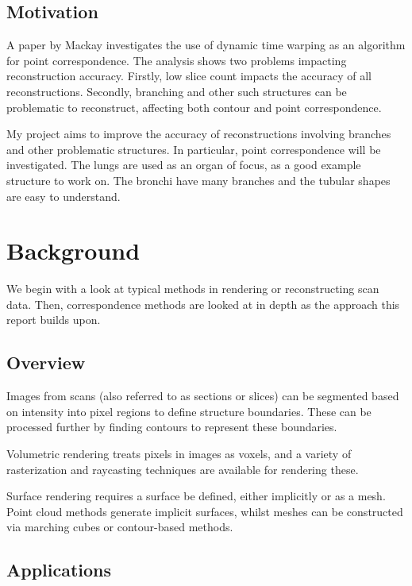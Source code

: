 \documentclass[11p, titlepage]{article}
\begin{document}
\subsection{Motivation}

A paper by Mackay \cite{mackay2019robust} investigates the use of dynamic time warping as an algorithm for point correspondence. The analysis shows two problems impacting reconstruction accuracy. Firstly, low slice count impacts the accuracy of all reconstructions. Secondly, branching and other such structures can be problematic to reconstruct, affecting both contour and point correspondence.

My project aims to improve the accuracy of reconstructions involving branches and other problematic structures. In particular, point correspondence will be investigated. The lungs are used as an organ of focus, as a good example structure to work on. The bronchi have many branches and the tubular shapes are easy to understand.

\section{Background}

We begin with a look at typical methods in rendering or reconstructing scan data. Then, correspondence methods are looked at in depth as the approach this report builds upon.

\subsection{Overview}

Images from scans (also referred to as sections or slices) can be segmented based on intensity into pixel regions to define structure boundaries. These can be processed further by finding contours to represent these boundaries.

Volumetric rendering treats pixels in images as voxels, and a variety of rasterization and raycasting techniques are available for rendering these.

Surface rendering requires a surface be defined, either implicitly or as a mesh. Point cloud methods generate implicit surfaces, whilst meshes can be constructed via marching cubes or contour-based methods.

\subsection{Applications}
\end{document}
